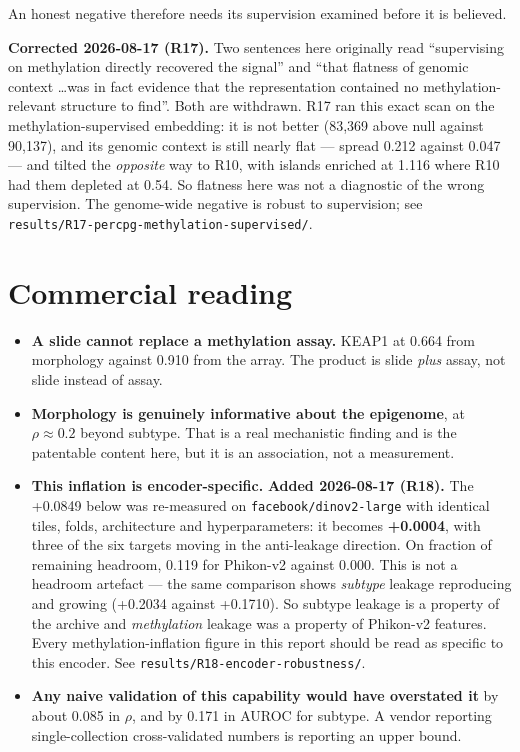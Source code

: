 \documentclass[11pt,a4paper]{article}
\begin{document}
An honest negative therefore needs its supervision examined before it is believed.

\textcolor{qred}{\textbf{Corrected 2026-08-17 (R17).}} Two sentences here originally read
``supervising on methylation directly recovered the signal'' and ``that flatness of genomic
context \ldots was in fact evidence that the representation contained no methylation-relevant
structure to find''. Both are withdrawn. R17 ran this exact scan on the methylation-supervised
embedding: it is not better (83{,}369 above null against 90{,}137), and its genomic context is
still nearly flat --- spread 0.212 against 0.047 --- and tilted the \emph{opposite} way to R10,
with islands enriched at 1.116 where R10 had them depleted at 0.54. So flatness here was not a
diagnostic of the wrong supervision. The genome-wide negative is robust to supervision; see
\texttt{results/R17-percpg-methylation-supervised/}.

\section{Commercial reading}

\begin{itemize}[leftmargin=1.2em,itemsep=3pt]
\item \textbf{A slide cannot replace a methylation assay.} KEAP1 at 0.664 from morphology
against 0.910 from the array. The product is slide \emph{plus} assay, not slide instead of assay.
\item \textbf{Morphology is genuinely informative about the epigenome}, at $\rho \approx 0.2$
beyond subtype. That is a real mechanistic finding and is the patentable content here, but it is
an association, not a measurement.
\item \textbf{This inflation is encoder-specific.} \textcolor{qred}{\textbf{Added 2026-08-17
      (R18).}} The +0.0849 below was re-measured on \texttt{facebook/dinov2-large} with identical
      tiles, folds, architecture and hyperparameters: it becomes \textbf{+0.0004}, with three of the
      six targets moving in the anti-leakage direction. On fraction of remaining headroom, 0.119
      for Phikon-v2 against 0.000. This is not a headroom artefact --- the same comparison shows
      \emph{subtype} leakage reproducing and growing (+0.2034 against +0.1710). So subtype leakage
      is a property of the archive and \emph{methylation} leakage was a property of Phikon-v2
      features. Every methylation-inflation figure in this report should be read as specific to
      this encoder. See \texttt{results/R18-encoder-robustness/}.
\item \textbf{Any naive validation of this capability would have overstated it} by about 0.085
in $\rho$, and by 0.171 in AUROC for subtype. A vendor reporting single-collection
cross-validated numbers is reporting an upper bound.
\end{itemize}
\end{document}
